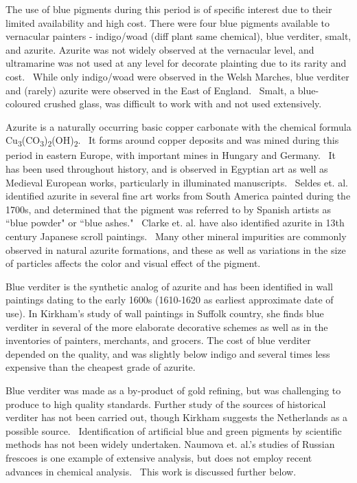 The use of blue pigments during this period is of specific interest due to their limited availability and high cost. There were four blue pigments available to vernacular painters - indigo/woad (diff plant same chemical), blue verditer, smalt, and azurite. Azurite was not widely observed at the vernacular level, and ultramarine was not used at any level for decorate plainting due to its rarity and cost.~\autocite{Kirkham_thesis} While only indigo/woad were observed in the Welsh Marches, blue verditer and (rarely) azurite were observed in the East of England.~\autocite{Baird_thesis,Davies_book,Kirkham_thesis} Smalt, a blue-coloured crushed glass, was difficult to work with and not used extensively.~\autocite{Kirkham_thesis}

Azurite is a naturally occurring basic copper carbonate with the chemical formula Cu\textsubscript{3}(CO\textsubscript{3})\textsubscript{2}(OH)\textsubscript{2}.~\autocite{Aru,Smieska} It forms around copper deposits and was mined during this period in eastern Europe, with important mines in Hungary and Germany.~\autocite{Aru} It has been used throughout history, and is observed in Egyptian art as well as Medieval European works, particularly in illuminated manuscripts.~\autocite{Smieska} Seldes et. al. identified azurite in several fine art works from South America painted during the 1700s, and determined that the pigment was referred to by Spanish artists as ``blue powder" or ``blue ashes."~\autocite{Seldes} Clarke et. al. have also identified azurite in 13th century Japanese scroll paintings.~\autocite{Clarke} Many other mineral impurities are commonly observed in natural azurite formations, and these as well as variations in the size of particles affects the color and visual effect of the pigment.~\autocite{Smieska,Price,Cardell}

Blue verditer is the synthetic analog of azurite and has been identified in wall paintings dating to the early 1600s (1610-1620 as earliest approximate date of use). In Kirkham's study of wall paintings in Suffolk country, she finds blue verditer in several of the more elaborate decorative schemes as well as in the inventories of painters, merchants, and grocers. The cost of blue verditer depended on the quality, and was slightly below indigo and several times less expensive than the cheapest grade of azurite.~\autocite{Kirkham_thesis} 

Blue verditer was made as a by-product of gold refining, but was challenging to produce to high quality standards. Further study of the sources of historical verditer has not been carried out, though Kirkham suggests the Netherlands as a possible source.~\autocite{Kirkham_thesis,Kirby} Identification of artificial blue and green pigments by scientific methods has not been widely undertaken. Naumova et. al.'s studies of Russian frescoes is one example of extensive analysis, but does not employ recent advances in chemical analysis.~\autocite{Naumova1994,Naumova1990} This work is discussed further below.

